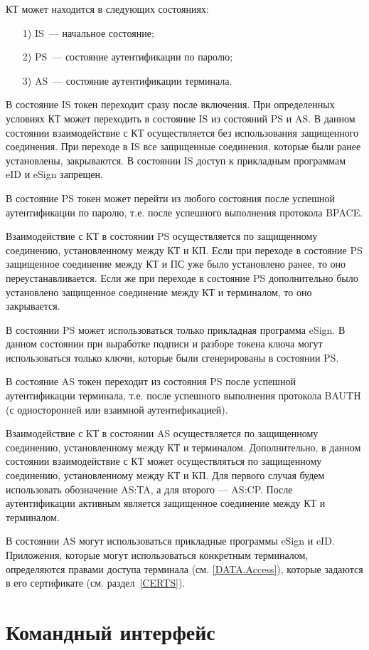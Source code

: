 КТ может находится в следующих состояниях:
%
\begin{itemize}
\item[1)]
IS~--- начальное состояние;
\item[2)]
PS~--- состояние аутентификации по паролю;
\item[3)]
AS~--- состояние аутентификации терминала.
\end{itemize}

В состояние IS токен переходит сразу после включения.
При определенных условиях КТ может переходить в состояние
IS из состояний PS и AS.
В данном состоянии взаимодействие с КТ осуществляется без использования 
защищенного соединения. При переходе в IS все защищенные соединения, 
которые были ранее установлены, закрываются.
В состоянии IS доступ к прикладным программам eID и eSign запрещен.

В состояние PS токен может перейти из любого состояния 
после успешной аутентификации по паролю, 
т.е. после успешного выполнения протокола BPACE. 
%

Взаимодействие с КТ в состоянии PS  осуществляется по 
защищенному соединению, установленному между КТ и КП. 
Если при переходе в состояние PS защищенное соединение между КТ и ПС уже было 
установлено ранее, то оно переустанавливается. 
Если же при переходе в состояние PS дополнительно было установлено 
защищенное соединение между КТ и терминалом, то оно закрывается.

В состоянии PS может использоваться только прикладная программа eSign.
В данном состоянии при выработке подписи и разборе токена ключа
могут использоваться только ключи, которые были 
сгенерированы в состоянии PS.

В состояние AS токен переходит из состояния PS 
после успешной аутентификации терминала, т.е. 
после успешного выполнения протокола BAUTH 
(с односторонней или взаимной аутентификацией). 

Взаимодействие с КТ в состоянии AS осуществляется по 
защищенному соединению, установленному между КТ и терминалом.
Дополнительно, в данном состоянии 
взаимодействие с КТ может осуществляться 
по защищенному соединению, установленному между КТ и КП.
Для первого случая будем использовать обозначение AS:TA, 
а для второго --- AS:CP. 
После аутентификации активным является защищенное 
соединение между КТ и терминалом.


В состоянии AS могут использоваться прикладные программы eSign и eID. 
Приложения, которые могут использоваться конкретным терминалом,
определяются правами доступа терминала (см. \ref{DATA.Access}),
которые задаются в его сертификате (см. раздел~\ref{CERTS}).
 

\chapter{Командный интерфейс}
\label{CMDS}




